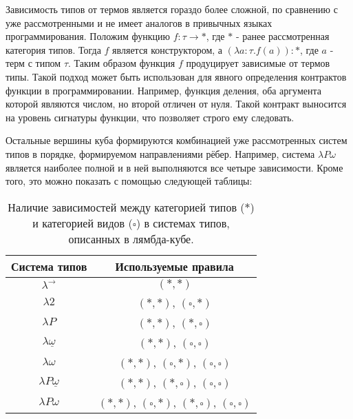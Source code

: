 Зависимость типов от термов является гораздо более сложной, по сравнению с уже рассмотренными и не имеет аналогов в привычных языках программирования.
Положим функцию $f: \tau \to *$, где $*$ - ранее рассмотренная категория типов.
Тогда $f$ является конструктором, а $(\lambda a: \tau. f(a)) : *$, где $a$ - терм с типом $\tau$.
Таким образом функция $f$ продуцирует зависимые от термов типы.
Такой подход может быть использован для явного определения контрактов функции в программировании.
Например, функция деления, оба аргумента которой являются числом, но второй отличен от нуля.
Такой контракт выносится на уровень сигнатуры функции, что позволяет строго ему следовать.

Остальные вершины куба формируются комбинацией уже рассмотренных систем типов в порядке, формируемом направлениями рёбер.
Например, система $\lambda P \omega$ является наиболее полной и в ней выполняются все четыре зависимости.
Кроме того, это можно показать с помощью следующей таблицы:

\begin{table}[h]
    \centering
    \caption{Наличие зависимостей между категорией типов ($*$) и категорией видов ($\square$) в системах типов, описанных в лямбда-кубе.}
    \label{tab:}
    \begin{tabular}{|c|c|}
        \hline
        \textbf{Система типов}        & \textbf{Используемые правила}                                  \\\hline
        $\lambda^{\to}$               & $(*, *)$                                                       \\\hline
        $\lambda 2$                   & $(*, *)$, $(\square, *)$                                       \\\hline
        $\lambda P$                   & $(*, *)$, $(*, \square)$                                       \\\hline
        $\lambda \underline{\omega}$  & $(*, *)$, $(\square, \square)$                                 \\\hline
        $\lambda \omega$              & $(*, *)$, $(\square, *)$, $(\square, \square)$                 \\\hline
        $\lambda P\underline{\omega}$ & $(*, *)$, $(*, \square)$, $(\square, \square)$                 \\\hline
        $\lambda P\omega$             & $(*, *)$, $(\square, *)$, $(*, \square)$, $(\square, \square)$ \\
        \hline
    \end{tabular}
\end{table}

